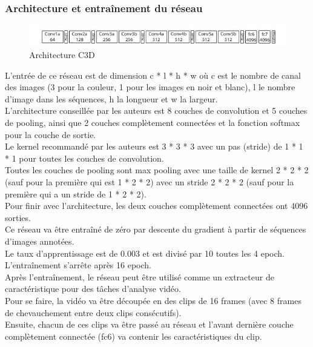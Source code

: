 \documentclass[11pt]{article}
\begin{document}
\subsubsection{Architecture et entraînement du réseau}
\label{sec:org3470d40}
\begin{figure}[htbp]
\centering
\includegraphics[width=13cm]{c3d_architecture.jpg}
\caption{Architecture C3D \label{arch-c3d}}
\end{figure}
L'entrée de ce réseau est de dimension c * l * h * w où c est le nombre de canal des images (3 pour la couleur, 1 pour les images en noir et blanc), l le nombre d'image dans les séquences, h la longueur et w la largeur.\\

L'architecture conseillée par les auteurs est 8 couches de convolution et 5 couches de pooling, ainsi que 2 couches complètement connectées et la fonction softmax pour la couche de sortie.\\
Le kernel recommandé par les auteurs est 3 * 3 * 3 avec un pas (stride) de 1 * 1 * 1 pour toutes les couches de convolution.\\
Toutes les couches de pooling sont max pooling avec une taille de kernel 2 * 2 * 2 (sauf pour la première qui est 1 * 2 * 2) avec un stride 2 * 2 * 2 (sauf pour la première qui a un stride de 1 * 2 * 2).\\
Pour finir avec l'architecture, les deux couches complètement connectées ont 4096 sorties.\\

Ce réseau va être entraîné de zéro par descente du gradient à partir de séquences d'images annotées.\\
Le taux d'apprentissage est de 0.003 et est divisé par 10 toutes les 4 epoch.\\
L'entraînement s'arrête après 16 epoch.\\

Après l'entraînement, le réseau peut être utilisé comme un extracteur de caractéristique pour des tâches d'analyse vidéo.\\
Pour se faire, la vidéo va être découpée en des clips de 16 frames (avec 8 frames de chevauchement entre deux clips consécutifs).\\
Ensuite, chacun de ces clips va être passé au réseau et l'avant dernière couche complètement connectée (fc6) va contenir les caractéristiques du clip.\\
\end{document}
